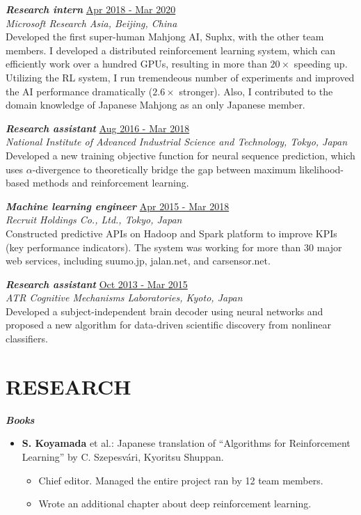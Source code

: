 \documentclass[margin, 10pt]{res} %
\begin{document}
\begin{resume}
{\sl {\bf Research intern}} \hfill {\small \underline{Apr 2018 - Mar 2020}} \\
{\it Microsoft Research Asia, Beijing, China} \\
Developed the first super-human Mahjong AI, Suphx, with the other team members.
I developed a distributed reinforcement learning system, which can efficiently work over a hundred GPUs, resulting in more than $20 \times$ speeding up.
Utilizing the RL system, I run tremendeous number of experiments and improved the AI performance dramatically ($2.6 \times$ stronger). 
Also, I contributed to the domain knowledge of Japanese Mahjong as an only Japanese member.

{\sl {\bf Research assistant}} \hfill {\small \underline{Aug 2016 - Mar 2018}} \\
{\it National Institute of Advanced Industrial Science and Technology, Tokyo, Japan} \\
Developed a new training objective function for neural sequence prediction, which uses $\alpha$-divergence to theoretically bridge the gap between maximum likelihood-based methods and reinforcement learning.

{\sl {\bf Machine learning engineer}} \hfill {\small \underline{Apr 2015 - Mar 2018}}\\
{\it Recruit Holdings Co., Ltd., Tokyo, Japan} \\
Constructed predictive APIs on Hadoop and Spark platform to improve KPIs (key performance indicators). The system was working for more than 30 major web services, including suumo.jp, jalan.net, and carsensor.net.

{\sl {\bf Research assistant}} \hfill {\small \underline{Oct 2013 - Mar 2015}} \\
{\it ATR Cognitive Mechanisms Laboratories, Kyoto, Japan}  \\
Developed a subject-independent brain decoder using neural networks and proposed a new algorithm for data-driven scientific discovery from nonlinear classifiers.

\section{{\small RESEARCH} }
{\sl {\bf Books}} \vspace{0.5em}
\begin{itemize}
\item {\bf S. Koyamada} et al.: Japanese translation of ``Algorithms for Reinforcement Learning'' by C. Szepesv{\'a}ri, Kyoritsu Shuppan.
  \begin{itemize}
  \item Chief editor. Managed the entire project ran by 12 team members.
  \item Wrote an additional chapter about deep reinforcement learning.
  \end{itemize}
\end{itemize}


\end{resume}
\end{document}
